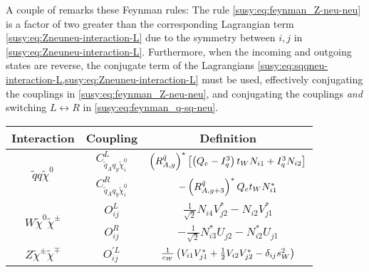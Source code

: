 \documentclass[../main.tex]{subfiles}
\begin{document}
A couple of remarks these Feynman rules:
The rule \cref{susy:eq:feynman_Z-neu-neu} is a factor of two greater than the corresponding Lagrangian term \cref{susy:eq:Zneuneu-interaction-L} due to the symmetry between \(i, j\) in \cref{susy:eq:Zneuneu-interaction-L}.
Furthermore, when the incoming and outgoing states are reverse, the conjugate term of the Lagrangians \cref{susy:eq:sqqneu-interaction-L,susy:eq:Zneuneu-interaction-L} must be used, effectively conjugating the couplings in \cref{susy:eq:feynman_Z-neu-neu}, and conjugating the couplings \emph{and} switching \(L \leftrightarrow R\) in \cref{susy:eq:feynman_q-sq-neu}.
{\renewcommand{\arraystretch}{2}
\begin{table}[ht!]
  \centering
  \begin{tabular}{|c|c|c|}
    \hline
    Interaction                                            & Coupling                                            & Definition
    \\
    \hline
    \multirow{2}{*}{\(\tilde{q} q \tilde\chi^0\)}          & \(C_{\tilde{q}_A q_g \tilde{\chi}_i^0}^{L}\)        & \(\left(R^{\tilde{q}}_{A,g}\right)^\ast \left[\left(Q_e-I^3_q\right) t_W N_{i1} + I^3_q N_{i2}\right]\)                                                                                             \\
                                                           & \(C_{\tilde{q}_A q_g \tilde{\chi}_i^0}^{R}\)        & \(-\left(R^{\tilde{q}}_{A,g+3}\right)^\ast Q_e t_W N_{i1}^\ast\)                                                                                                                              \\
    \hline
    \multirow{2}{*}{\(W \tilde\chi^0 \tilde\chi^\pm\)}     & \(O_{ij}^L\)                                        & \(\frac{1}{\sqrt{2}} N_{i4} V_{j2}^\ast - N_{i2}V_{j1}^\ast\)                                                                                                                              \\
                                                           & \(O_{ij}^R\)                                        & \(-\frac{1}{\sqrt{2}} N_{i3}^\ast U_{j2} - N_{i2}^\ast U_{j1}\)                                                                                                                            \\
    \hline
    \multirow{2}{*}{\(Z \tilde\chi^\pm \tilde\chi^\mp\)}   & \(O_{ij}^{\prime L}\)                               & \(\frac{1}{c_W} \left(V_{i1} V_{j1}^\ast + \frac{1}{2} V_{i2}V_{j2}^\ast - \delta_{ij} s_W^2\right)\)                                                                                         \\

\end{tabular}
\end{table}}
\end{document}
